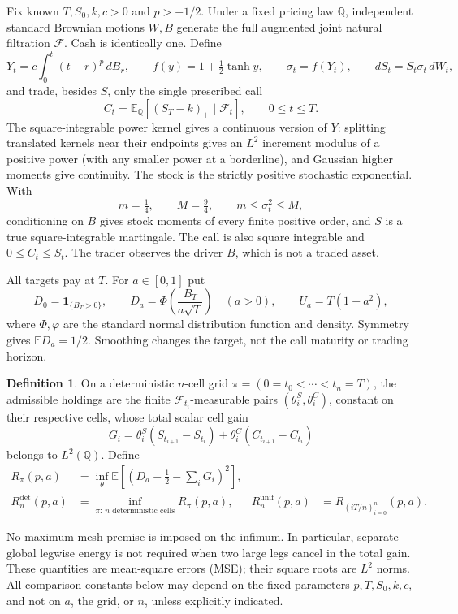 \documentclass[11pt,a4paper]{amsart}
\theoremstyle{plain}
\theoremstyle{definition}
\newtheorem{definition}[theorem]{Definition}
\theoremstyle{remark}
\newcommand{\EE}{\mathbb{E}}
\newcommand{\QQ}{\mathbb{Q}}
\newcommand{\F}{\mathcal F}
\newcommand{\ph}{\varphi}
\newcommand{\unif}{\mathrm{unif}}
\newcommand{\detm}{\mathrm{det}}
\begin{document}
Fix known $T,S_0,k,c>0$ and $p>-1/2$. Under a fixed pricing law $\QQ$, independent standard Brownian motions $W,B$ generate the full augmented joint natural filtration $\F$. Cash is identically one. Define
\begin{equation}\label{eq:market}
 Y_t=c\int_0^t(t-r)^p\,dB_r,\qquad
 f(y)=1+\tfrac12\tanh y,\qquad \sigma_t=f(Y_t),
 \qquad dS_t=S_t\sigma_t\,dW_t,
\end{equation}
and trade, besides $S$, only the single prescribed call
\begin{equation}\label{eq:call-contract}
 C_t=\EE_{\QQ}[(S_T-k)_+\mid\F_t],\qquad 0\le t\le T.
\end{equation}
The square-integrable power kernel gives a continuous version of $Y$: splitting translated kernels near their endpoints gives an $L^2$ increment modulus of a positive power (with any smaller power at a borderline), and Gaussian higher moments give continuity. The stock is the strictly positive stochastic exponential. With
\begin{equation}\label{eq:variance-bounds}
 m=\tfrac14,\qquad M=\tfrac94,
 \qquad m\le\sigma_t^2\le M,
\end{equation}
conditioning on $B$ gives stock moments of every finite positive order, and $S$ is a true square-integrable martingale. The call is also square integrable and $0\le C_t\le S_t$. The trader observes the driver $B$, which is not a traded asset.

All targets pay at $T$. For $a\in[0,1]$ put
\begin{equation}\label{eq:targets}
 D_0=\mathbf1_{\{B_T>0\}},\qquad
 D_a=\Phi\left(\frac{B_T}{a\sqrt T}\right)\quad(a>0),
 \qquad U_a=T(1+a^2),
\end{equation}
where $\Phi,\ph$ are the standard normal distribution function and density. Symmetry gives $\EE D_a=1/2$. Smoothing changes the target, not the call maturity or trading horizon.

\begin{definition}\label{def:gain}
On a deterministic $n$-cell grid $\pi=(0=t_0<\cdots<t_n=T)$, the admissible holdings are the finite $\F_{t_i}$-measurable pairs $(\theta_i^S,\theta_i^C)$, constant on their respective cells, whose total scalar cell gain
\[
 G_i=\theta_i^S(S_{t_{i+1}}-S_{t_i})+
       \theta_i^C(C_{t_{i+1}}-C_{t_i})
\]
belongs to $L^2(\QQ)$. Define
\begin{align}
 R_\pi(p,a)&=\inf_\theta\EE\left[
       \left(D_a-\tfrac12-\sum_iG_i\right)^2\right],\label{eq:risk}\\
 R_n^{\detm}(p,a)&=\inf_{\pi:\,n\text{ deterministic cells}}R_\pi(p,a),
 &R_n^{\unif}(p,a)&=R_{(iT/n)_{i=0}^n}(p,a).\label{eq:risk-inf}
\end{align}
\end{definition}
No maximum-mesh premise is imposed on the infimum. In particular, separate global legwise energy is not required when two large legs cancel in the total gain. These quantities are mean-square errors (MSE); their square roots are $L^2$ norms. All comparison constants below may depend on the fixed parameters $p,T,S_0,k,c$, and not on $a$, the grid, or $n$, unless explicitly indicated.
\end{document}
